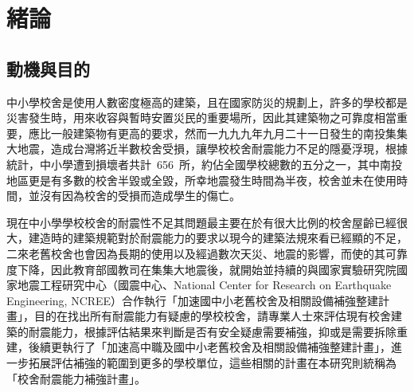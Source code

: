% 
\chapter{緒論}
\label{cha:intro} 



\section{動機與目的}

中小學校舍是使用人數密度極高的建築，且在國家防災的規劃上，許多的學校都是災害發生時，用來收容與暫時安置災民的重要場所，因此其建築物之可靠度相當重要，應比一般建築物有更高的要求，然而一九九九年九月二十一日發生的南投集集大地震，造成台灣將近半數校舍受損，讓學校校舍耐震能力不足的隱憂浮現，根據統計，中小學遭到損壞者共計~656~所，約佔全國學校總數的五分之一，其中南投地區更是有多數的校舍半毀或全毀，所幸地震發生時間為半夜，校舍並未在使用時間，並沒有因為校舍的受損而造成學生的傷亡。

現在中小學學校校舍的耐震性不足其問題最主要在於有很大比例的校舍屋齡已經很大，建造時的建築規範對於耐震能力的要求以現今的建築法規來看已經顯的不足，二來老舊校舍也會因為長期的使用以及經過數次天災、地震的影響，而使的其可靠度下降，因此教育部國教司在集集大地震後，就開始並持續的與國家實驗研究院國家地震工程研究中心（國震中心、National Center for Research on Earthquake Engineering, NCREE）合作執行「加速國中小老舊校舍及相關設備補強整建計畫」，目的在找出所有耐震能力有疑慮的學校校舍，請專業人士來評估現有校舍建築的耐震能力，根據評估結果來判斷是否有安全疑慮需要補強，抑或是需要拆除重建，後續更執行了「加速高中職及國中小老舊校舍及相關設備補強整建計畫」，進一步拓展評估補強的範圍到更多的學校單位，這些相關的計畫在本研究則統稱為「校舍耐震能力補強計畫」。

